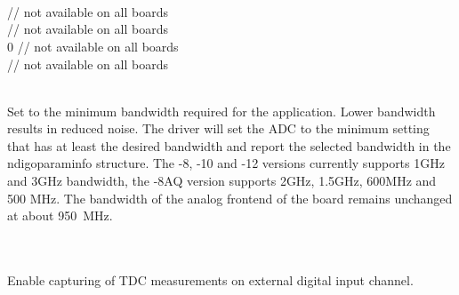 			\\
			\\
			\\
			\\
			\\
			\\
			\\
			\\
			\\
			\\
			\\
			\\
			\\
			 // not available on all boards\\
			 // not available on all boards\\
			0 // not available on all boards\\
			 // not available on all boards\par

			\\
			Set to the minimum bandwidth required for the application. Lower bandwidth results in reduced noise. The driver will set the ADC to the minimum setting that has at least the desired bandwidth and report the selected bandwidth in the \textsf{ndigo\tu param\tu info} structure. The -8, -10 and -12 versions currently supports 1GHz and 3GHz bandwidth, the -8AQ version supports 2GHz, 1.5GHz, 600MHz and 500 MHz. The bandwidth of the analog frontend of the board remains unchanged at about \SI{950}{\MHz}.
			\par

			\\
			\\
			Enable capturing of TDC measurements on external digital input channel.\par
			

